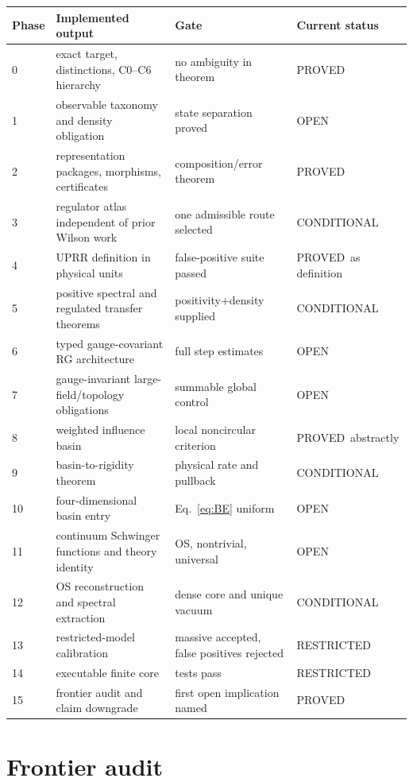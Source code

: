 \documentclass[11pt]{article}
\newcommand{\Pstatus}{\textcolor{proved}{\textsf{PROVED}}}
\newcommand{\Cstatus}{\textcolor{conditional}{\textsf{CONDITIONAL}}}
\newcommand{\Ostatus}{\textcolor{open}{\textsf{OPEN}}}
\newcommand{\Rstatus}{\textcolor{proved}{\textsf{RESTRICTED}}}
\theoremstyle{remark}
\begin{document}
\begin{longtable}{p{}p{}p{}p{}}
\toprule
Phase & Implemented output & Gate & Current status\\
\midrule
\endhead
0 & exact target, distinctions, C0--C6 hierarchy & no ambiguity in theorem & \Pstatus\\
1 & observable taxonomy and density obligation & state separation proved & \Ostatus\\
2 & representation packages, morphisms, certificates & composition/error theorem & \Pstatus\\
3 & regulator atlas independent of prior Wilson work & one admissible route selected & \Cstatus\\
4 & UPRR definition in physical units & false-positive suite passed & \Pstatus\ as definition\\
5 & positive spectral and regulated transfer theorems & positivity+density supplied & \Cstatus\\
6 & typed gauge-covariant RG architecture & full step estimates & \Ostatus\\
7 & gauge-invariant large-field/topology obligations & summable global control & \Ostatus\\
8 & weighted influence basin & local noncircular criterion & \Pstatus\ abstractly\\
9 & basin-to-rigidity theorem & physical rate and pullback & \Cstatus\\
10 & four-dimensional basin entry & Eq.~\eqref{eq:BE} uniform & \Ostatus\\
11 & continuum Schwinger functions and theory identity & OS, nontrivial, universal & \Ostatus\\
12 & OS reconstruction and spectral extraction & dense core and unique vacuum & \Cstatus\\
13 & restricted-model calibration & massive accepted, false positives rejected & \Rstatus\\
14 & executable finite core & tests pass & \Rstatus\\
15 & frontier audit and claim downgrade & first open implication named & \Pstatus\\
\bottomrule
\end{longtable}

\section{Frontier audit}
\end{document}
